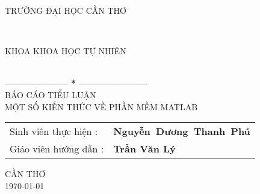 \documentclass[12pt,a4paper]{article}
\begin{document}
\thispagestyle{empty}
\thisfancypage{
\setlength{\fboxsep}{0pt}
\fbox}{} 
\begin{center}
\begin{large}
TRƯỜNG ĐẠI HỌC CẦN THƠ
\end{large} \\
\begin{large}
KHOA KHOA HỌC TỰ NHIÊN
\end{large} \\
\textbf{--------------------  *  ---------------------}\\[7cm]
{\fontsize{32pt}{1}\selectfont BÁO CÁO TIỂU LUẬN}\\
{\fontsize{20pt}{1}\selectfont MỘT SỐ KIẾN THỨC VỀ PHẦN MỀM MATLAB}\\[5cm]
\end{center}


\indent \begin{tabular}{ll}
  Sinh viên thực hiện : &\textbf{Nguyễn~Dương~Thanh~Phú} \\
  Giáo viên hướng dẫn : &\textbf{Trần Văn Lý} 
\end{tabular}



\vspace{6cm}
\begin{center}
{\fontsize{16pt}{1}\selectfont CẦN THƠ}\\
{\fontsize{16pt}{1}\selectfont \today}
\end{center}
\end{document}
